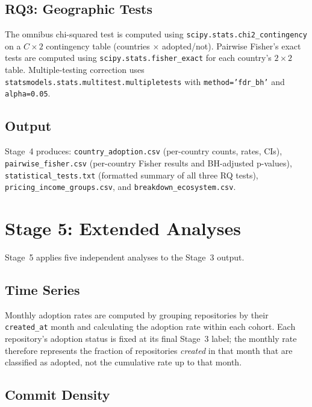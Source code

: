 \subsection{RQ3: Geographic Tests}

The omnibus chi-squared test is computed using \texttt{scipy.stats.chi2\_contingency} on a $C \times 2$ contingency table (countries $\times$ adopted/not). Pairwise Fisher's exact tests are computed using \texttt{scipy.stats.fisher\_exact} for each country's $2 \times 2$ table. Multiple-testing correction uses \texttt{statsmodels.stats.multitest.multipletests} with \texttt{method='fdr\_bh'} and \texttt{alpha=0.05}.

\subsection{Output}

Stage~4 produces: \texttt{country\_adoption.csv} (per-country counts, rates, CIs), \texttt{pairwise\_fisher.csv} (per-country Fisher results and BH-adjusted p-values), \texttt{statistical\_tests.txt} (formatted summary of all three RQ tests), \texttt{pricing\_income\_groups.csv}, and \texttt{breakdown\_ecosystem.csv}.

\section{Stage 5: Extended Analyses}
\label{sec:impl:extended}

Stage~5 applies five independent analyses to the Stage~3 output.

\subsection{Time Series}

Monthly adoption rates are computed by grouping repositories by their \texttt{created\_at} month and calculating the adoption rate within each cohort. Each repository's adoption status is fixed at its final Stage~3 label; the monthly rate therefore represents the fraction of repositories \emph{created} in that month that are classified as adopted, not the cumulative rate up to that month.

\subsection{Commit Density}

